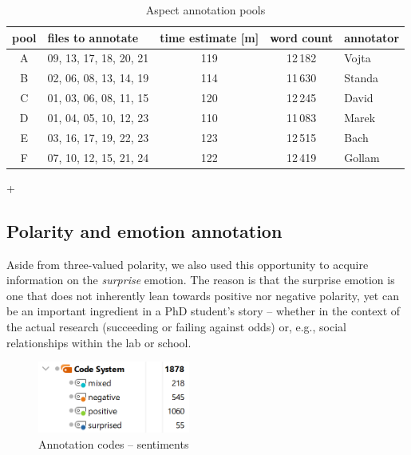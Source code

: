 \documentclass{kerauth}
\begin{document}
\begin{table}[ht]
\small
\centering
\begin{tabular}{|c|l|c|c|l|}
\hline
\textbf{pool} & \textbf{files to annotate} & \textbf{time estimate {[}m{]}} & \textbf{word count} & \textbf{annotator} \\ \hline
A             & 09, 13, 17, 18, 20, 21     & 119                            & 12\,182               & Vojta              \\ \hline
B             & 02, 06, 08, 13, 14, 19     & 114                            & 11\,630               & Standa             \\ \hline
C             & 01, 03, 06, 08, 11, 15     & 120                            & 12\,245               & David              \\ \hline
D             & 01, 04, 05, 10, 12, 23     & 110                            & 11\,083               & Marek              \\ \hline
E             & 03, 16, 17, 19, 22, 23     & 123                            & 12\,515               & Bach               \\ \hline
F             & 07, 10, 12, 15, 21, 24     & 122                            & 12\,419               & Gollam             \\ \hline
\end{tabular}
\caption[aspect-annotation-pools]{Aspect annotation pools}
\label{aspect-annotation-pools}
\end{table}+

\subsection{Polarity and emotion annotation}
Aside from three-valued polarity, we also used this opportunity to acquire information on the \emph{surprise} emotion.
The reason is that the surprise emotion is one that does not inherently lean towards positive nor negative polarity, yet can be an important ingredient in a PhD student's story -- whether in the context of the actual research (succeeding or failing against odds) or, e.g., social relationships within the lab or school.


\begin{figure}[ht]
  \centering
  \includegraphics[width=5cm]{figures/sentiment-codes.png}
  \caption[sentiment-codes]{Annotation codes -- sentiments}
  \label{fig:sentiment-codes}
\end{figure}
\end{document}
